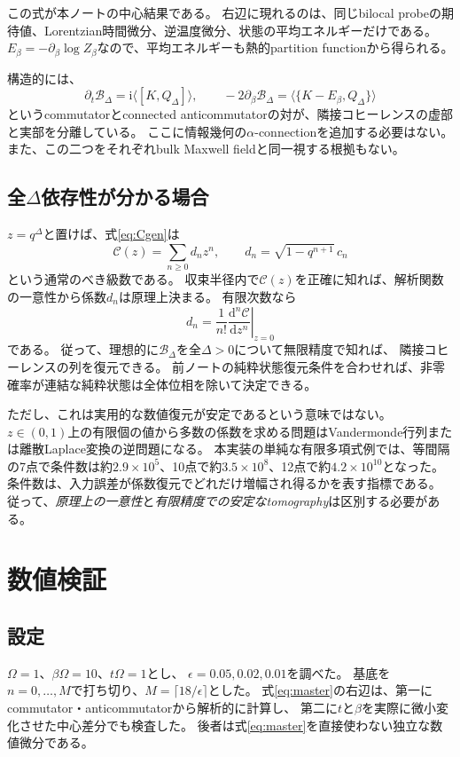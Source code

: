 \documentclass[a4paper,11pt]{ltjsarticle}
\numberwithin{equation}{section}
\newcommand{\dd}{\mathrm d}
\newcommand{\ii}{\mathrm i}
\begin{document}
この式が本ノートの中心結果である。
右辺に現れるのは、同じbilocal probeの期待値、Lorentzian時間微分、逆温度微分、状態の平均エネルギーだけである。
$E_\beta=-\partial_\beta\log Z_\beta$なので、平均エネルギーも熱的partition functionから得られる。

構造的には、
\begin{equation}
 \partial_t\mathcal B_\Delta=\ii\langle[K,Q_\Delta]\rangle,
 \qquad
 -2\partial_\beta\mathcal B_\Delta=\langle\{K-E_\beta,Q_\Delta\}\rangle
 \label{eq:commanti}
\end{equation}
というcommutatorとconnected anticommutatorの対が、隣接コヒーレンスの虚部と実部を分離している。
ここに情報幾何の$\alpha$-connectionを追加する必要はない。
また、この二つをそれぞれbulk Maxwell fieldと同一視する根拠もない。

\subsection{全$\Delta$依存性が分かる場合}
$z=q^\Delta$と置けば、式\eqref{eq:Cgen}は
\begin{equation}
 \mathcal C(z)=\sum_{n\geq0}d_nz^n,
 \qquad
 d_n=\sqrt{1-q^{n+1}}\,c_n
 \label{eq:power}
\end{equation}
という通常のべき級数である。
収束半径内で$\mathcal C(z)$を正確に知れば、解析関数の一意性から係数$d_n$は原理上決まる。
有限次数なら
\begin{equation}
 d_n=\frac{1}{n!}\left.\frac{\dd^n\mathcal C}{\dd z^n}\right|_{z=0}
 \label{eq:coeff}
\end{equation}
である。
従って、理想的に$\mathcal B_\Delta$を全$\Delta>0$について無限精度で知れば、
隣接コヒーレンスの列を復元できる。
前ノートの純粋状態復元条件を合わせれば、非零確率が連結な純粋状態は全体位相を除いて決定できる。

ただし、これは実用的な数値復元が安定であるという意味ではない。
$z\in(0,1)$上の有限個の値から多数の係数を求める問題はVandermonde行列または離散Laplace変換の逆問題になる。
本実装の単純な有限多項式例では、等間隔の7点で条件数は約$2.9\times10^5$、10点で約$3.5\times10^8$、12点で約$4.2\times10^{10}$となった。
条件数は、入力誤差が係数復元でどれだけ増幅され得るかを表す指標である。
従って、\emph{原理上の一意性}と\emph{有限精度での安定なtomography}は区別する必要がある。

\section{数値検証}
\subsection{設定}
$\Omega=1$、$\beta\Omega=10$、$t\Omega=1$とし、
$\epsilon=0.05,0.02,0.01$を調べた。
基底を$n=0,\ldots,M$で打ち切り、$M=\lceil18/\epsilon\rceil$とした。
式\eqref{eq:master}の右辺は、第一にcommutator・anticommutatorから解析的に計算し、
第二に$t$と$\beta$を実際に微小変化させた中心差分でも検査した。
後者は式\eqref{eq:master}を直接使わない独立な数値微分である。
\end{document}
